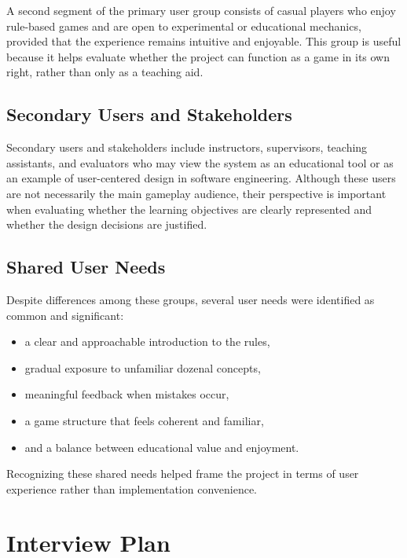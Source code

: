 \documentclass[12pt]{article}
\begin{document}
    A second segment of the primary user group consists of casual players who enjoy rule-based games and are open to experimental or educational mechanics, provided that the experience remains intuitive and enjoyable. This group is useful because it helps evaluate whether the project can function as a game in its own right, rather than only as a teaching aid.

    \subsection{Secondary Users and Stakeholders}

    Secondary users and stakeholders include instructors, supervisors, teaching assistants, and evaluators who may view the system as an educational tool or as an example of user-centered design in software engineering. Although these users are not necessarily the main gameplay audience, their perspective is important when evaluating whether the learning objectives are clearly represented and whether the design decisions are justified.

    \subsection{Shared User Needs}

    Despite differences among these groups, several user needs were identified as common and significant:

    \begin{itemize}[leftmargin=2em]
        \item a clear and approachable introduction to the rules,
        \item gradual exposure to unfamiliar dozenal concepts,
        \item meaningful feedback when mistakes occur,
        \item a game structure that feels coherent and familiar,
        \item and a balance between educational value and enjoyment.
    \end{itemize}

    Recognizing these shared needs helped frame the project in terms of user experience rather than implementation convenience.

    \section{Interview Plan}
\end{document}
